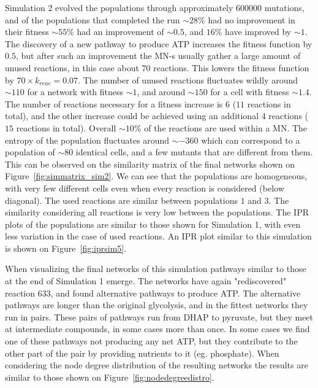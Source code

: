 \documentclass[a4paper,12pt]{article}
\begin{document}
Simulation 2 evolved the populations through approximately $600 000$ mutations, and of the populations that completed the run $\sim 28 \%$ had no improvement in their fitness $\sim 55 \%$ had an improvement of $\sim 0.5$, and $16 \%$ have improved by $\sim 1$. The discovery of a new pathway to produce ATP increases the fitness function by $0.5$, but after such an improvement the MN-s usually gather a large amount of unused reactions, in this case about $70$ reactions. This lowers the fitness function by $70\times k_{reac}=0.07$. The number of unused reactions fluctuates wildly around $\sim 110$ for a network with fitness $\sim 1$, and around $\sim 150$ for a cell with fitness $\sim 1.4$. The number of reactions necessary for a fitness increase is $6$ ($11$ reactions in total), and the other increase could be achieved using an additional $4$ reactions ($15$ reactions in total). Overall $\sim 10\%$ of the reactions are used within a MN.  The entropy of the population fluctuates around $\sim -360$ which can correspond to a population of $\sim 80$ identical cells, and a few mutants that are different from them. This can be observed on the similarity matrix of the final networks shown on Figure~\ref{fig:simmatrix_sim2}. We can see that the populations are homogeneous, with very few different cells even when every reaction is considered (below diagonal). The used reactions are similar between populations $1$ and $3$. The similarity considering all reactions is very low between the populations. 
The IPR plots of the populations are similar to those shown for Simulation 1, with even less variation in the case of used reactions. An IPR plot similar to this simulation is shown on Figure~\ref{fig:iprsim5}. 

When visualizing the final networks of this simulation pathways similar to those at the end of Simulation 1 emerge. The networks have again "rediscovered" reaction $633$, and found alternative pathways to produce ATP. The alternative pathways are longer than the original glycolysis, and in the fittest networks they run in pairs. These pairs of pathways run from DHAP to pyruvate, but they meet at intermediate compounds, in some cases more than once. In some cases we find one of these pathways not producing any net ATP, but they contribute to the other part of the pair by providing nutrients to it (eg. phosphate). When considering the node degree distribution of the resulting networks the results are similar to those shown on Figure~\ref{fig:nodedegreedistro}. 
\end{document}
